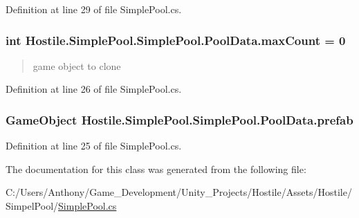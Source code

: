 Definition at line 29 of file Simple\-Pool.\-cs.

\hypertarget{class_hostile_1_1_simple_pool_1_1_simple_pool_1_1_pool_data_a184e81d595ad9455d412f67162c7b1c9}{
\subsubsection[{max\-Count}]{\setlength{\rightskip}{0pt plus 5cm}int Hostile.\-Simple\-Pool.\-Simple\-Pool.\-Pool\-Data.\-max\-Count = 0}}\label{class_hostile_1_1_simple_pool_1_1_simple_pool_1_1_pool_data_a184e81d595ad9455d412f67162c7b1c9}


\begin{quotation}
game object to clone \end{quotation}




Definition at line 26 of file Simple\-Pool.\-cs.

\hypertarget{class_hostile_1_1_simple_pool_1_1_simple_pool_1_1_pool_data_a07ccce81192461026b94dc8f9aa8d818}{
\subsubsection[{prefab}]{\setlength{\rightskip}{0pt plus 5cm}Game\-Object Hostile.\-Simple\-Pool.\-Simple\-Pool.\-Pool\-Data.\-prefab}}\label{class_hostile_1_1_simple_pool_1_1_simple_pool_1_1_pool_data_a07ccce81192461026b94dc8f9aa8d818}


Definition at line 25 of file Simple\-Pool.\-cs.



The documentation for this class was generated from the following file\-:\begin{DoxyCompactItemize}
\item 
C\-:/\-Users/\-Anthony/\-Game\-\_\-\-Development/\-Unity\-\_\-\-Projects/\-Hostile/\-Assets/\-Hostile/\-Simpel\-Pool/\hyperlink{_simple_pool_8cs}{Simple\-Pool.\-cs}\end{DoxyCompactItemize}
